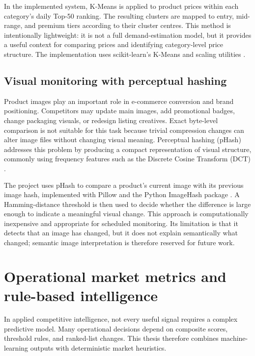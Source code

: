In the implemented system, K-Means is applied to product prices within
each category's daily Top-50 ranking. The resulting clusters are mapped
to entry, mid-range, and premium tiers according to their cluster
centres. This method is intentionally lightweight: it is not a full
demand-estimation model, but it provides a useful context for comparing
prices and identifying category-level price structure. The implementation
uses scikit-learn's K-Means and scaling utilities \citep{pedregosa2011sklearn}.

\subsection{Visual monitoring with perceptual hashing}

Product images play an important role in e-commerce conversion and brand
positioning. Competitors may update main images, add promotional badges,
change packaging visuals, or redesign listing creatives. Exact
byte-level comparison is not suitable for this task because trivial
compression changes can alter image files without changing visual
meaning. Perceptual hashing (pHash) addresses this problem by producing
a compact representation of visual structure, commonly using frequency
features such as the Discrete Cosine Transform (DCT) \citep{zauner2010phash}.

The project uses pHash to compare a product's current image with its
previous image hash, implemented with Pillow and the Python ImageHash
package \citep{pillow2026docs, buchner2024imagehash}. A Hamming-distance
threshold is then used to decide whether the difference is large enough
to indicate a meaningful visual change. This approach is computationally
inexpensive and appropriate for scheduled monitoring. Its limitation is
that it detects that an image has changed, but it does not explain
semantically what changed; semantic image interpretation is therefore
reserved for future work.

\section{Operational market metrics and rule-based intelligence}

In applied competitive intelligence, not every useful signal requires a
complex predictive model. Many operational decisions depend on composite
scores, threshold rules, and ranked-list changes. This thesis therefore
combines machine-learning outputs with deterministic market heuristics.

